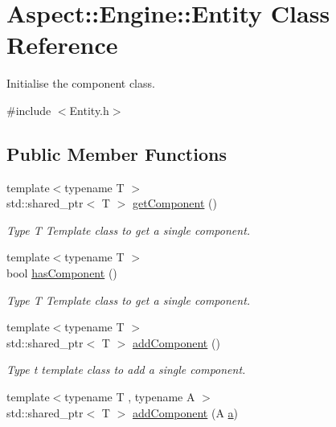 \hypertarget{class_aspect_1_1_engine_1_1_entity}{}\section{Aspect\+:\+:Engine\+:\+:Entity Class Reference}
\label{class_aspect_1_1_engine_1_1_entity}


Initialise the component class.  




{\ttfamily \#include $<$Entity.\+h$>$}

\subsection*{Public Member Functions}
\begin{DoxyCompactItemize}
\item 
{\footnotesize template$<$typename T $>$ }\\std\+::shared\+\_\+ptr$<$ T $>$ \mbox{\hyperlink{class_aspect_1_1_engine_1_1_entity_a5fdedcbe74684afa991dc83b6c7b96a1}{get\+Component}} ()
\begin{DoxyCompactList}\small\item\em Type T Template class to get a single component. \end{DoxyCompactList}\item 
{\footnotesize template$<$typename T $>$ }\\bool \mbox{\hyperlink{class_aspect_1_1_engine_1_1_entity_accfb5d56f8f88f9007504e580120a777}{has\+Component}} ()
\begin{DoxyCompactList}\small\item\em Type T Template class to get a single component. \end{DoxyCompactList}\item 
{\footnotesize template$<$typename T $>$ }\\std\+::shared\+\_\+ptr$<$ T $>$ \mbox{\hyperlink{class_aspect_1_1_engine_1_1_entity_ae7a087ed64f4fec3b61ff2cba098d19a}{add\+Component}} ()
\begin{DoxyCompactList}\small\item\em Type t template class to add a single component. \end{DoxyCompactList}\item 
{\footnotesize template$<$typename T , typename A $>$ }\\std\+::shared\+\_\+ptr$<$ T $>$ \mbox{\hyperlink{class_aspect_1_1_engine_1_1_entity_aac44f29e1ad32261d7853e59a7562671}{add\+Component}} (A \mbox{\hyperlink{_s_d_l__opengl__glext_8h_a3309789fc188587d666cda5ece79cf82}{a}})

\end{DoxyCompactItemize}
